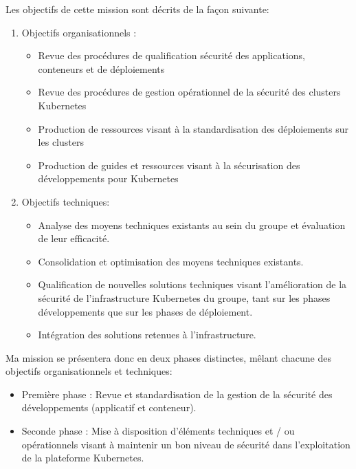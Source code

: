 Les objectifs de cette mission sont décrits de la façon suivante:
\begin{enumerate}
    \item Objectifs organisationnels : 
    \begin{itemize}
        \item Revue des procédures de qualification sécurité des applications, conteneurs et de déploiements
        \item Revue des procédures de gestion opérationnel de la sécurité des clusters Kubernetes
        \item Production de ressources visant à la standardisation des déploiements sur les clusters
        \item Production de guides et ressources visant à la sécurisation des développements pour Kubernetes
    \end{itemize}
    \item Objectifs techniques:
    \begin{itemize}
        \item Analyse des moyens techniques existants au sein du groupe et évaluation de leur efficacité.
        \item Consolidation et optimisation des moyens techniques existants.
        \item Qualification de nouvelles solutions techniques visant l’amélioration de la sécurité de l’infrastructure Kubernetes du  groupe, 
        tant sur les phases développements que sur les phases de déploiement.
        \item Intégration des solutions retenues à l’infrastructure. 
    \end{itemize}
\end{enumerate}

Ma mission se présentera donc en deux phases distinctes, mêlant chacune des objectifs organisationnels et techniques:
\begin{itemize}
    \item \textmd{Première phase :} Revue et standardisation de la gestion de la sécurité des développements (applicatif et 
    conteneur).
    \item Seconde phase : Mise à disposition d'éléments techniques et / ou opérationnels visant à maintenir un bon 
    niveau de sécurité dans l'exploitation de la plateforme Kubernetes. 
\end{itemize}

